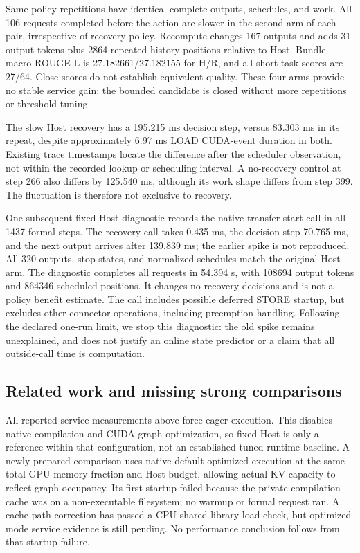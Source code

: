 \documentclass[10pt,a4paper]{article}
\begin{document}
Same-policy repetitions have identical complete outputs, schedules, and work.
All 106 requests completed before the action are slower in the second arm of
each pair, irrespective of recovery policy. Recompute changes 167 outputs and
adds 31 output tokens plus 2864 repeated-history positions relative to Host.
Bundle-macro ROUGE-L is 27.182661/27.182155 for H/R, and all short-task scores
are 27/64. Close scores do not establish equivalent quality. These four arms
provide no stable service gain; the bounded candidate is closed without more
repetitions or threshold tuning.

The slow Host recovery has a 195.215 ms decision step, versus 83.303 ms in its
repeat, despite approximately 6.97 ms LOAD CUDA-event duration in both. Existing
trace timestamps locate the difference after the scheduler observation, not
within the recorded lookup or scheduling interval. A no-recovery control at
step 266 also differs by 125.540 ms, although its work shape differs from
step 399. The fluctuation is therefore not exclusive to recovery.

One subsequent fixed-Host diagnostic records the native transfer-start call
in all 1437 formal steps. The recovery call takes 0.435 ms, the decision step
70.765 ms, and the next output arrives after 139.839 ms; the earlier spike is
not reproduced. All 320 outputs, stop states, and normalized schedules match
the original Host arm. The diagnostic completes all requests in 54.394 s,
with 108694 output tokens and 864346 scheduled positions. It changes no
recovery decisions and is not a policy benefit estimate. The call includes
possible deferred STORE startup, but excludes other connector operations,
including preemption handling. Following the declared one-run limit, we stop
this diagnostic: the old spike remains unexplained, and does not justify an
online state predictor or a claim that all outside-call time is computation.

\subsection{Related work and missing strong comparisons}
All reported service measurements above force eager execution. This disables
native compilation and CUDA-graph optimization, so fixed Host is only a
reference within that configuration, not an established tuned-runtime baseline.
A newly prepared comparison uses native default optimized execution at the
same total GPU-memory fraction and Host budget, allowing actual KV capacity
to reflect graph occupancy. Its first startup failed because the private
compilation cache was on a non-executable filesystem; no warmup or formal
request ran. A cache-path correction has passed a CPU shared-library load
check, but optimized-mode service evidence is still pending. No performance
conclusion follows from that startup failure.
\end{document}
